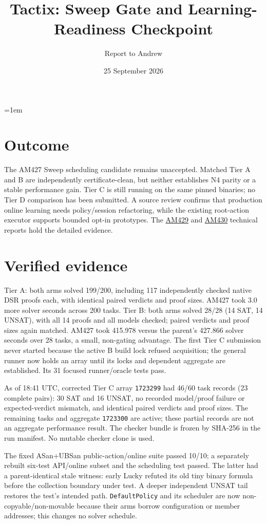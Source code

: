 \documentclass[10pt]{article}
\title{Tactix: Sweep Gate and Learning-Readiness Checkpoint}
\author{Report to Andrew}
\date{25 September 2026}
\begin{document}
\maketitle
\vspace{-1.5em}
\emergencystretch=1em

\section*{Outcome}
The AM427 Sweep scheduling candidate remains unaccepted. Matched Tier A and B
are independently certificate-clean, but neither establishes N4 parity or a
stable performance gain. Tier C is still running on the same pinned binaries;
no Tier D comparison has been submitted. A source review confirms that
production online learning needs policy/session refactoring, while the existing
root-action executor supports bounded opt-in prototypes. The
\href{../../benchmarks/reports/2026-09-25-am429-sweep-tier-b-and-slurm-lock.md}{AM429}
and \href{../../benchmarks/reports/2026-09-25-am430-policy-lifetime-and-scheduling-fixture.md}{AM430}
technical reports hold the detailed evidence.

\section*{Verified evidence}
Tier A: both arms solved 199/200, including 117 independently checked native
DSR proofs each, with identical paired verdicts and proof sizes. AM427 took
3.0 more solver seconds across 200 tasks. Tier B: both arms solved 28/28
(14 SAT, 14 UNSAT), with all 14 proofs and all models checked; paired verdicts
and proof sizes again matched. AM427 took 415.978 versus the parent's 427.866
solver seconds over 28 tasks, a small, non-gating advantage. The first Tier C
submission never started because the active B build lock refused acquisition;
the general runner now holds an array until its locks and dependent aggregate
are established. Its 31 focused runner/oracle tests pass.

As of 18:41 UTC, corrected Tier C array \texttt{1723299} had 46/60 task
records (23 complete pairs): 30 SAT and 16 UNSAT, no recorded model/proof
failure or expected-verdict mismatch, and identical paired verdicts and proof
sizes. The remaining tasks and aggregate \texttt{1723300} are active; these
partial records are not an aggregate performance result. The checker bundle
is frozen by SHA-256 in the run manifest. No mutable checker clone is used.

The fixed ASan+UBSan public-action/online suite passed 10/10; a separately
rebuilt six-test API/online subset and the scheduling test passed. The latter
had a parent-identical stale witness: early Lucky refuted its old tiny binary
formula before the collection boundary under test. A deeper independent
UNSAT tail restores the test's intended path. \texttt{DefaultPolicy} and its
scheduler are now non-copyable/non-movable because their arms borrow
configuration or member addresses; this changes no solver schedule.
\end{document}
